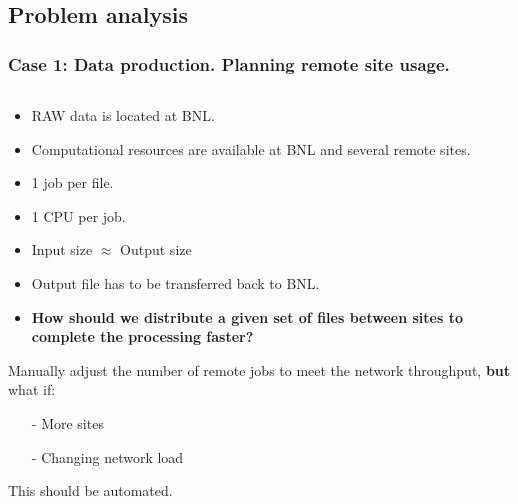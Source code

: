 \documentclass{beamer}
\begin{document}
\subsection{Problem analysis}
\begin{frame}\frametitle{Case 1: Data production. Planning remote site usage. }
 	\begin{columns}[c] %
    \begin{footnotesize}
    \vspace{-11mm}
	\begin{block}{}
		\begin{itemize}
		\item RAW data is located at BNL.
		\item Computational resources are available at BNL and several remote sites.
		\item 1 job per file.
		\item 1 CPU per job. 
		\item Input size $\approx$ Output size
		\item Output file has to be transferred back to BNL.
		\item \textbf{How should we distribute a given set of files between sites to complete the processing faster?}
		\end{itemize}
 	\end{block} 	
 	
 	\begin{block}{}
 	Manually adjust the number of remote jobs to meet the network throughput, \textbf{but} what if:
		\begin{itemize}
		\item[-] More sites
		\item[-] Changing network load
		\end{itemize}
	This should be automated.
 	\end{block} 	
 	     


\end{footnotesize}
\end{columns}
\end{frame}
\end{document}
